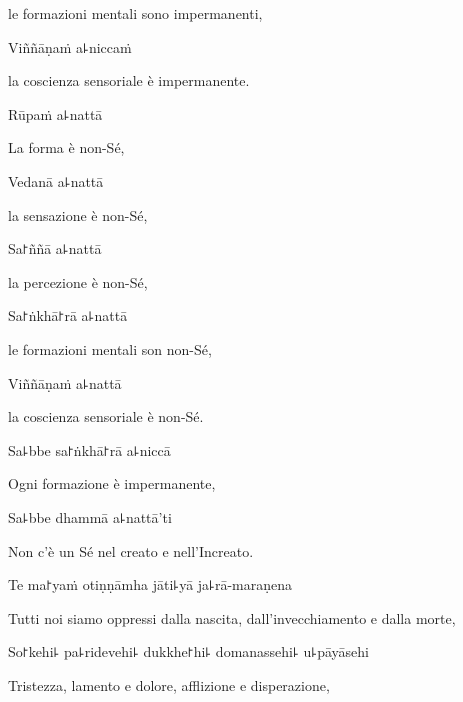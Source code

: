 \begin{english}
le formazioni mentali sono impermanenti,
\end{english}

Viññāṇaṁ a꜕niccaṁ

\begin{english}
la coscienza sensoriale è impermanente. 
\end{english}

Rūpaṁ a꜕nattā

\begin{english}
La forma è non-Sé,
\end{english}

Vedanā a꜕nattā

\begin{english}
la sensazione è non-Sé,
\end{english}

Sa꜓ññā a꜕nattā

\begin{english}
la percezione è non-Sé,
\end{english}

Sa꜓ṅkhā꜓rā a꜕nattā

\begin{english}
le formazioni mentali son non-Sé, 
\end{english}

Viññāṇaṁ a꜕nattā

\begin{english}
la coscienza sensoriale è non-Sé.
\end{english}

Sa꜕bbe sa꜓ṅkhā꜓rā a꜕niccā

\begin{english}
Ogni formazione è impermanente,
\end{english}

Sa꜕bbe dhammā a꜕nattā'ti

\begin{english}
Non c'è un Sé nel creato e nell'Increato.
\end{english}

Te ma꜓yaṁ otiṇṇāmha jāti꜕yā ja꜕rā-maraṇena

\begin{english}
Tutti noi siamo oppressi dalla nascita, dall'invecchiamento e dalla morte,
\end{english}

So꜓kehi꜕ pa꜕ridevehi꜕ dukkhe꜓hi꜕ domanassehi꜕ u꜕pāyāsehi

\begin{english}
Tristezza, lamento e dolore, afflizione e disperazione,
\end{english}

